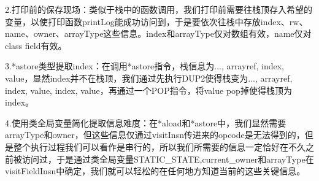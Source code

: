 \documentclass[UTF8]{article}
\begin{document}
2.打印前的保存现场：类似于栈中的函数调用，我们打印前需要往栈顶存入希望的变量，以使打印函数printLog能成功访问到，于是要依次往栈中存放index、rw、name、owner、arrayType这些信息。index和arrayType仅对数组有效，name仅对class field有效。

3.*astore类型提取index：在调用*astore指令，栈信息为..., arrayref, index, value，显然index并不在栈顶，我们通过先执行DUP2使得栈变为..., arrayref, index, value, index, value，再通过一个POP指令，将value pop掉使得栈顶为index。

4.使用类全局变量简化提取信息难度：在*aload和*astore中，我们显然需要arrayType和owner，但这些信息仅通过visitInsn传进来的opcode是无法得到的，但是整个执行过程我们可以看作是串行的，所以我们所需要的信息一定恰好在不久之前被访问过，于是通过类全局变量STATIC\_STATE,current\_owner和arrayType在visitFieldInsn中确定，我们就可以轻松的在任何地方知道当前的这些关键信息。


\end{document}
